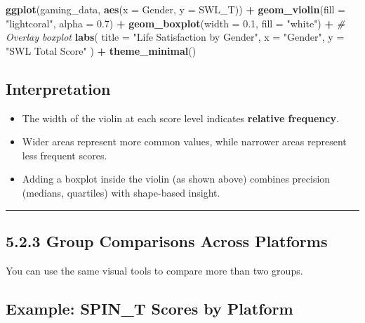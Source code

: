 \documentclass[
]{book}
\newenvironment{Shaded}{\begin{snugshade}}{\end{snugshade}}
\newcommand{\AttributeTok}[1]{\textcolor[rgb]{0.13,0.29,0.53}{#1}}
\newcommand{\CommentTok}[1]{\textcolor[rgb]{0.56,0.35,0.01}{\textit{#1}}}
\newcommand{\FloatTok}[1]{\textcolor[rgb]{0.00,0.00,0.81}{#1}}
\newcommand{\FunctionTok}[1]{\textcolor[rgb]{0.13,0.29,0.53}{\textbf{#1}}}
\newcommand{\NormalTok}[1]{#1}
\newcommand{\SpecialCharTok}[1]{\textcolor[rgb]{0.81,0.36,0.00}{\textbf{#1}}}
\newcommand{\StringTok}[1]{\textcolor[rgb]{0.31,0.60,0.02}{#1}}
\providecommand{\tightlist}{%
  \setlength{\itemsep}{0pt}\setlength{\parskip}{0pt}}
\begin{document}
\begin{Shaded}
\begin{Highlighting}[]
\FunctionTok{ggplot}\NormalTok{(gaming\_data, }\FunctionTok{aes}\NormalTok{(}\AttributeTok{x =}\NormalTok{ Gender, }\AttributeTok{y =}\NormalTok{ SWL\_T)) }\SpecialCharTok{+}
  \FunctionTok{geom\_violin}\NormalTok{(}\AttributeTok{fill =} \StringTok{"lightcoral"}\NormalTok{, }\AttributeTok{alpha =} \FloatTok{0.7}\NormalTok{) }\SpecialCharTok{+}
  \FunctionTok{geom\_boxplot}\NormalTok{(}\AttributeTok{width =} \FloatTok{0.1}\NormalTok{, }\AttributeTok{fill =} \StringTok{"white"}\NormalTok{) }\SpecialCharTok{+}  \CommentTok{\# Overlay boxplot}
  \FunctionTok{labs}\NormalTok{(}
    \AttributeTok{title =} \StringTok{"Life Satisfaction by Gender"}\NormalTok{,}
    \AttributeTok{x =} \StringTok{"Gender"}\NormalTok{,}
    \AttributeTok{y =} \StringTok{"SWL Total Score"}
\NormalTok{  ) }\SpecialCharTok{+}
  \FunctionTok{theme\_minimal}\NormalTok{()}
\end{Highlighting}
\end{Shaded}

\subsection{Interpretation}\label{interpretation-10}

\begin{itemize}
\tightlist
\item
  The width of the violin at each score level indicates \textbf{relative frequency}.
\item
  Wider areas represent more common values, while narrower areas represent less frequent scores.
\item
  Adding a boxplot inside the violin (as shown above) combines precision (medians, quartiles) with shape-based insight.
\end{itemize}

\begin{center}\rule{0.5\linewidth}{0.5pt}\end{center}

\subsection{5.2.3 Group Comparisons Across Platforms}\label{group-comparisons-across-platforms}

You can use the same visual tools to compare more than two groups.

\subsection{Example: SPIN\_T Scores by Platform}\label{example-spin_t-scores-by-platform}
\end{document}
